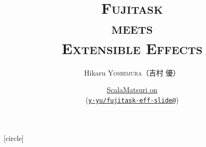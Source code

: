 \setmonofont[Ligatures=TeX]{CMU Typewriter Text}

\newcommand{\xcolon}{：}
\newcommand{\Fujitask}{{\rmfamily\bfseries Fujitask}}

\title[Fujitask meets Extensible Effects]{%
  {\bfseries\rmfamily\mcfamily\huge\scshape
    \Fujitask \\
    meets\\
    Extensible Effects%
  }%
}
\author[Hikaru Yoshimura]{%
  Hikaru \textsc{Yoshimura}（吉村 優）
}
\date[ScalaMatsuri, June 209 2019]{%
  \href{https://2019.scalamatsuri.org/}{ScalaMatsuri on } \\
  {\scriptsize (\href{https://github.com/y-yu/fujitask-eff-slide}{\texttt{y-yu/fujitask-eff-slide@\GITAbrHash}})}%
}







[circle]

\newcommand\ballcircle[1]{%
  {%
    \usebeamercolor{enumerate item}%
    \tikzset{beameritem/.style={circle,inner sep=0,minimum size=2ex,text=enumerate item.bg,fill=enumerate item.fg,font=\footnotesize}}%
    \tikz[baseline=(n.base)]\node(n)[beameritem]{#1};%
  }
}
\newcommand\ballref[1]{%
  \ballcircle{\ref{#1}}
}

\newcommand\ce[1]{%
  \coloremoji{#1}
}

\newenvironment{notes}
  {%
    \begin{xlrbox}{NotesBox}
    \begin{minipage}{.95\textwidth}
    \small\rmfamily\mcfamily
    \begin{itemize}
    \setlength{\itemindent}{0em}
  }{%
    \end{itemize}
    \end{minipage}
    \end{xlrbox}
    \note{\theNotesBox}}

\makeatletter
\newsavebox\temp@simple@callout@box
\newcommand{\simplecallout}[3]{%
  \sbox{\temp@simple@callout@box}{\mbox{#3}}%
  \begin{center}%
    \begin{tikzpicture}%
      \calloutquote[width=1.1\wd\temp@simple@callout@box,position={(#1.5,-0.2)},fill=#2,rounded corners]{
        #3%
      }%
    \end{tikzpicture}%
  \end{center}
}
\makeatother



